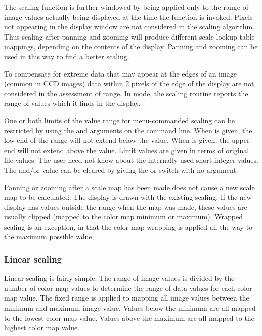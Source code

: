 The scaling function is further windowed by being applied only to the
range of image values actually being displayed at the time the
function is invoked.  Pixels not appearing in the display window are
not considered in the scaling algorithm.  Thus scaling after panning
and zooming will produce different scale lookup table mappings,
depending on the contents of the display.  Panning and zooming can be
used in this way to find a better scaling.

To compensate for extreme data that may appear at the edges of an image
(common in CCD images) data within 2 pixels of the edge of the display
are not considered in the assessment of range.  In  mode,
the scaling routine reports the range of values which it finds in the
display.

One or both limits of the value range for menu-commanded scaling can
be restricted by using the  and  arguments on the
command line.  When  is given, the low end of the range will
not extend below the  value.  When  is given, the
upper end will not extend above the  value.  Limit values are
given in terms of original file values. The user need not know about
the internally used short integer values.  The  and/or
 value can be cleared by giving the 
or  switch with no argument.

Panning or zooming after a scale map has been made does not cause a new
scale map to be calculated.  The display is drawn with the existing
scaling.  If the new display has values outside the range when the map
was made, these values are usually clipped (mapped to the color map
minimum or maximum).  Wrapped scaling is an exception, in that the 
color map wrapping is applied all the way to the maximum possible
value.

\subsubsection{ Linear scaling } \label{linscale-sec}

Linear scaling is fairly simple.  The range of image values is divided by
the number of color map values to determine the range of data values for
each color map value.  The fixed range is applied to mapping all image
values between the minimum and maximum image value.  Values below the
minimum are all mapped to the lowest color map value.  Values above
the maximum are all mapped to the highest color map value.

